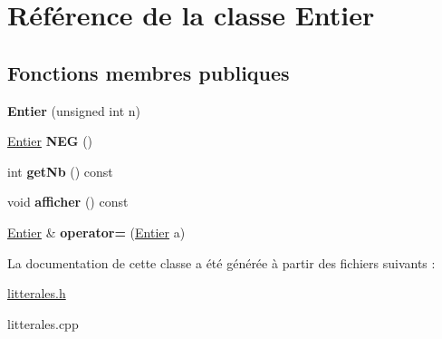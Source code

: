 \hypertarget{class_entier}{\section{Référence de la classe Entier}
\label{class_entier}
}
\subsection*{Fonctions membres publiques}
\begin{DoxyCompactItemize}
\item 
\hypertarget{class_entier_a9a0e9f1c834e9291e529fe82bf086519}{{\bfseries Entier} (unsigned int n)}\label{class_entier_a9a0e9f1c834e9291e529fe82bf086519}

\item 
\hypertarget{class_entier_a135b77c3d060672ef9d894df1807efec}{\hyperlink{class_entier}{Entier} {\bfseries N\-E\-G} ()}\label{class_entier_a135b77c3d060672ef9d894df1807efec}

\item 
\hypertarget{class_entier_af629506a8e26a70efbc6338d01b88711}{int {\bfseries get\-Nb} () const }\label{class_entier_af629506a8e26a70efbc6338d01b88711}

\item 
\hypertarget{class_entier_aee56c45261cd65d0fa4579e5a8de4a8e}{void {\bfseries afficher} () const }\label{class_entier_aee56c45261cd65d0fa4579e5a8de4a8e}

\item 
\hypertarget{class_entier_a67d48636df705d1a07f6b354c6a65034}{\hyperlink{class_entier}{Entier} \& {\bfseries operator=} (\hyperlink{class_entier}{Entier} a)}\label{class_entier_a67d48636df705d1a07f6b354c6a65034}

\end{DoxyCompactItemize}


La documentation de cette classe a été générée à partir des fichiers suivants \-:\begin{DoxyCompactItemize}
\item 
\hyperlink{litterales_8h}{litterales.\-h}\item 
litterales.\-cpp\end{DoxyCompactItemize}
